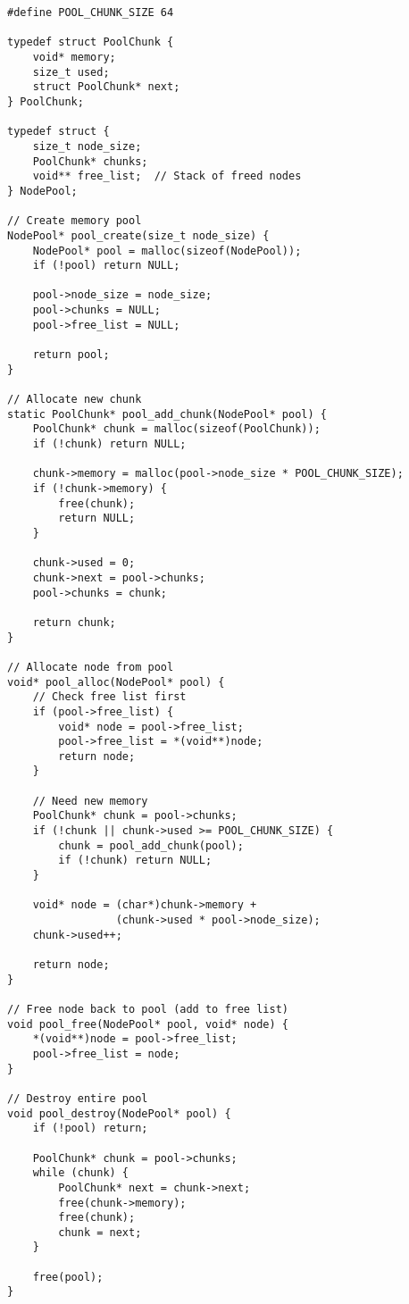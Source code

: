 \begin{lstlisting}
#define POOL_CHUNK_SIZE 64

typedef struct PoolChunk {
    void* memory;
    size_t used;
    struct PoolChunk* next;
} PoolChunk;

typedef struct {
    size_t node_size;
    PoolChunk* chunks;
    void** free_list;  // Stack of freed nodes
} NodePool;

// Create memory pool
NodePool* pool_create(size_t node_size) {
    NodePool* pool = malloc(sizeof(NodePool));
    if (!pool) return NULL;

    pool->node_size = node_size;
    pool->chunks = NULL;
    pool->free_list = NULL;

    return pool;
}

// Allocate new chunk
static PoolChunk* pool_add_chunk(NodePool* pool) {
    PoolChunk* chunk = malloc(sizeof(PoolChunk));
    if (!chunk) return NULL;

    chunk->memory = malloc(pool->node_size * POOL_CHUNK_SIZE);
    if (!chunk->memory) {
        free(chunk);
        return NULL;
    }

    chunk->used = 0;
    chunk->next = pool->chunks;
    pool->chunks = chunk;

    return chunk;
}

// Allocate node from pool
void* pool_alloc(NodePool* pool) {
    // Check free list first
    if (pool->free_list) {
        void* node = pool->free_list;
        pool->free_list = *(void**)node;
        return node;
    }

    // Need new memory
    PoolChunk* chunk = pool->chunks;
    if (!chunk || chunk->used >= POOL_CHUNK_SIZE) {
        chunk = pool_add_chunk(pool);
        if (!chunk) return NULL;
    }

    void* node = (char*)chunk->memory +
                 (chunk->used * pool->node_size);
    chunk->used++;

    return node;
}

// Free node back to pool (add to free list)
void pool_free(NodePool* pool, void* node) {
    *(void**)node = pool->free_list;
    pool->free_list = node;
}

// Destroy entire pool
void pool_destroy(NodePool* pool) {
    if (!pool) return;

    PoolChunk* chunk = pool->chunks;
    while (chunk) {
        PoolChunk* next = chunk->next;
        free(chunk->memory);
        free(chunk);
        chunk = next;
    }

    free(pool);
}


\end{lstlisting}

